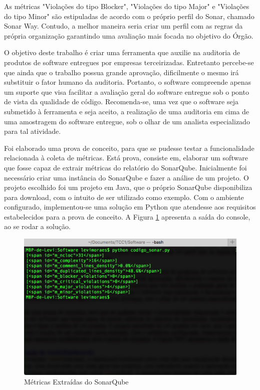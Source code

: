 As métricas "Violações do tipo Blocker", "Violações do tipo Major" e "Violações do tipo Minor" são estipuladas de acordo com o próprio perfil do Sonar, chamado Sonar Way. Contudo, a melhor maneira seria criar um perfil com as regras da própria organização garantindo uma avaliação mais focada no objetivo do Órgão.


O objetivo deste trabalho é criar uma ferramenta que auxilie na auditoria de produtos de software entregues por empresas terceirizadas. Entretanto percebe-se que ainda que o trabalho possua grande aprovação, dificilmente o mesmo irá substituir o fator humano da auditoria. Portanto, o software compreende apenas um suporte que visa facilitar a avaliação geral do software entregue sob o ponto de vista da qualidade de código. Recomenda-se, uma vez que o software seja submetido à ferramenta e seja aceito, a realização de uma auditoria em cima de uma amostragem do software entregue, sob o olhar de um analista especializado para tal atividade.

Foi elaborado uma prova de conceito, para que se pudesse testar a funcionalidade relacionada à coleta de métricas. Está prova, consiste em, elaborar um software que fosse capaz de extrair métricas do relatório do SonarQube. Inicialmente foi necessário criar uma instância do SonarQube e fazer a análise de um projeto. O projeto escolhido foi um projeto em Java, que o próprio SonarQube disponibiliza para download, com o intuito de ser utilizado como exemplo. Com o ambiente configurado, implementou-se uma solução em Python que atendesse aos requisitos estabelecidos para a prova de conceito. A Figura \ref{img:terminal} apresenta a saída do console, ao se rodar a solução.


\graphicspath{{figuras/}}
\begin{figure}[H]
\centering
\includegraphics[scale=0.60]{terminal.png}
\caption{Métricas Extraídas do SonarQube}
\label{img:terminal}
\end{figure}

